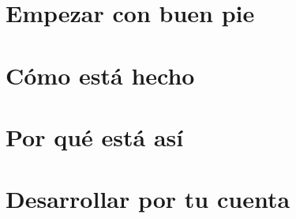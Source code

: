 \documentclass[11pt,a4paper,openany]{book}
\begin{document}
\frontmatter

\tableofcontents

\mainmatter

\part{Empezar con buen pie}


\part{Cómo está hecho}








\part{Por qué está así}



\part{Desarrollar por tu cuenta}




\appendix

\end{document}
